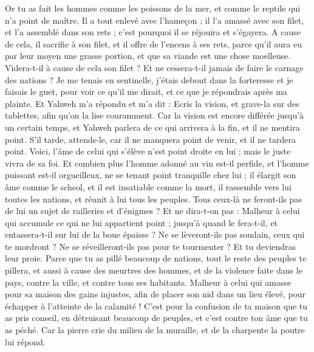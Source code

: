 \begin{multicols}{2}
Or tu as fait les hommes comme les poissons de la mer, et comme le reptile qui n'a point de maître.
Il a tout enlevé avec l'hameçon ; il l'a amassé avec son filet, et l'a assemblé dans son rets ; c'est pourquoi il se réjouira et s'égayera.
A cause de cela, il sacrifie à son filet, et il offre de l'encens à ses rets, parce qu'il aura eu par leur moyen une grasse portion, et que sa viande est une chose moelleuse.
Videra-t-il à cause de cela son filet ? Et ne cessera-t-il jamais de faire le carnage des nations ?
\VerseOne{}Je me tenais en sentinelle, j'étais debout dans la forteresse et je faisais le guet, pour voir ce qu'il me dirait, et ce que je répondrais après ma plainte.
Et Yahweh m'a répondu et m'a dit : Ecris la vision, et grave-la sur des tablettes, afin qu'on la lise couramment.
Car la vision est encore différée jusqu'à un certain temps, et Yahweh parlera de ce qui arrivera à la fin, et il ne mentira point. S'il tarde, attends-le, car il ne manquera point de venir, et il ne tardera point.
Voici, l'âme de celui qui s'élève n'est point droite en lui ; mais le juste vivra de sa foi.
Et combien plus l'homme adonné au vin est-il perfide, et l'homme puissant est-il orgueilleux, ne se tenant point tranquille chez lui ; il élargit son âme comme le scheol, et il est insatiable comme la mort, il rassemble vers lui toutes les nations, et réunit à lui tous les peuples.
Tous ceux-là ne feront-ils pas de lui un sujet de railleries et d'énigmes ? Et ne dira-t-on pas : Malheur à celui qui accumule ce qui ne lui appartient point ; jusqu'à quand le fera-t-il, et entassera-t-il sur lui de la boue épaisse ?
Ne se lèveront-ils pas soudain, ceux qui te mordront ? Ne se réveilleront-ils pas pour te tourmenter ? Et tu deviendras leur proie.
Parce que tu as pillé beaucoup de nations, tout le reste des peuples te pillera, et aussi à cause des meurtres des hommes, et de la violence faite dans le pays, contre la ville, et contre tous ses habitants.
Malheur à celui qui amasse pour sa maison des gains injustes, afin de placer son nid dans un lieu élevé, pour échapper à l'atteinte de la calamité !
C'est pour la confusion de ta maison que tu as pris conseil, en détruisant beaucoup de peuples, et c'est contre ton âme que tu as péché.
Car la pierre crie du milieu de la muraille, et de la charpente la poutre lui répond.

\end{multicols}
